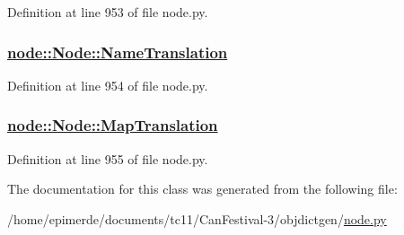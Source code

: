Definition at line 953 of file node.py.\hypertarget{classnode_1_1Node_f00e144081c08560aa31f6094bc1f260}{
\subsubsection[NameTranslation]{\setlength{\rightskip}{0pt plus 5cm}\hyperlink{classnode_1_1Node_f00e144081c08560aa31f6094bc1f260}{node::Node::Name\-Translation}}}
\label{classnode_1_1Node_f00e144081c08560aa31f6094bc1f260}




Definition at line 954 of file node.py.\hypertarget{classnode_1_1Node_a6b1b71fc6b6f9d52f142a808fa724a6}{
\subsubsection[MapTranslation]{\setlength{\rightskip}{0pt plus 5cm}\hyperlink{classnode_1_1Node_a6b1b71fc6b6f9d52f142a808fa724a6}{node::Node::Map\-Translation}}}
\label{classnode_1_1Node_a6b1b71fc6b6f9d52f142a808fa724a6}




Definition at line 955 of file node.py.

The documentation for this class was generated from the following file:\begin{CompactItemize}
\item 
/home/epimerde/documents/tc11/Can\-Festival-3/objdictgen/\hyperlink{node_8py}{node.py}\end{CompactItemize}
